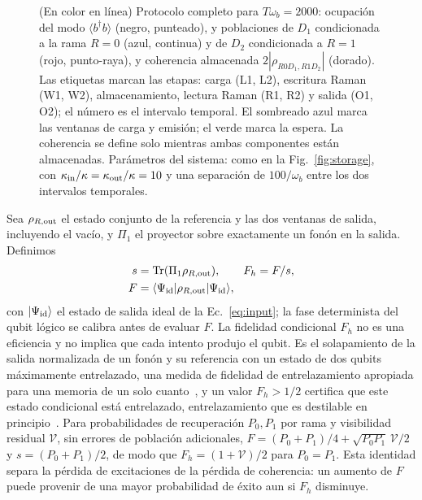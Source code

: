 \documentclass[aps,pra,twocolumn,groupedaddress,amsmath,amssymb,floatfix]{revtex4-2}
\newcommand{\ket}[1]{\lvert #1\rangle}
\newcommand{\bra}[1]{\langle #1\rvert}
\begin{document}
\begin{figure}[t]
\centering
\resizebox{\columnwidth}{!}{}
\caption{(En color en l\'inea) Protocolo completo para $T\omega_b=2000$: ocupaci\'on del modo $\langle b^\dagger b\rangle$ (negro, punteado), y poblaciones de $D_1$ condicionada a la rama $R=0$ (azul, continua) y de $D_2$ condicionada a $R=1$ (rojo, punto-raya), y coherencia almacenada $2|\rho_{R0D_1,R1D_2}|$ (dorado). Las etiquetas marcan las etapas: carga (L1, L2), escritura Raman (W1, W2), almacenamiento, lectura Raman (R1, R2) y salida (O1, O2); el n\'umero es el intervalo temporal. El sombreado azul marca las ventanas de carga y emisi\'on; el verde marca la espera. La coherencia se define solo mientras ambas componentes est\'an almacenadas. Par\'ametros del sistema: como en la Fig.~\ref{fig:storage}, con $\kappa_{\rm in}/\kappa=\kappa_{\rm out}/\kappa=10$ y una separaci\'on de $100/\omega_b$ entre los dos intervalos temporales.}
\label{fig:protocol}
\end{figure}

Sea $\rho_{R,{\rm out}}$ el estado conjunto de la referencia y las dos ventanas de salida, incluyendo el vac\'io, y $\Pi_1$ el proyector sobre exactamente un fon\'on en la salida. Definimos
\begin{align}
s&=\mathrm{Tr}(\Pi_1\rho_{R,{\rm out}}),\qquad
F_h=F/s,\nonumber\\
F&=\bra{\Psi_{\rm id}}\rho_{R,{\rm out}}\ket{\Psi_{\rm id}},\label{eq:metrics}
\end{align}
con $\ket{\Psi_{\rm id}}$ el estado de salida ideal de la Ec.~\eqref{eq:input}; la fase determinista del qubit l\'ogico se calibra antes de evaluar $F$. La fidelidad condicional $F_h$ no es una eficiencia y no implica que cada intento produjo el qubit. Es el solapamiento de la salida normalizada de un fon\'on y su referencia con un estado de dos qubits m\'aximamente entrelazado, una medida de fidelidad de entrelazamiento apropiada para una memoria de un solo cuanto~\cite{surmacz2006}, y un valor $F_h>1/2$ certifica que este estado condicional est\'a entrelazado, entrelazamiento que es destilable en principio~\cite{bennett1996,horodecki1997}. Para probabilidades de recuperaci\'on $P_0,P_1$ por rama y visibilidad residual $\mathcal V$, sin errores de poblaci\'on adicionales, $F=(P_0+P_1)/4+\sqrt{P_0P_1}\,\mathcal V/2$ y $s=(P_0+P_1)/2$, de modo que $F_h=(1+\mathcal V)/2$ para $P_0=P_1$. Esta identidad separa la p\'erdida de excitaciones de la p\'erdida de coherencia: un aumento de $F$ puede provenir de una mayor probabilidad de \'exito aun si $F_h$ disminuye.
\end{document}
